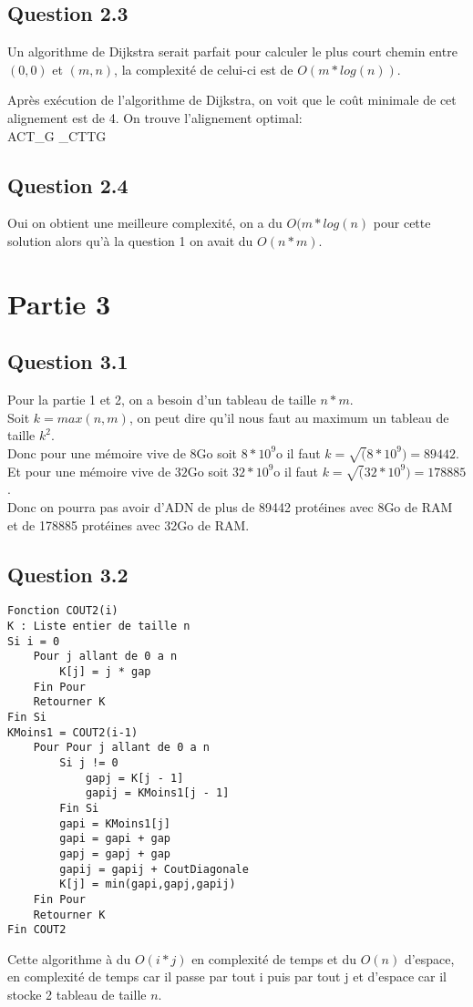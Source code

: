 \documentclass[5pt,a4paper]{report}
\begin{document}
	\subsection*{Question 2.3} 
	Un algorithme de Dijkstra serait parfait pour calculer le plus court chemin entre $(0,0)$ et $(m,n)$, la complexité de celui-ci est de $O(m*log(n))$.
	
	Après exécution de l'algorithme de Dijkstra, on voit que le coût minimale de cet alignement est de 4. On trouve l'alignement optimal:\\
	ACT\_G
	\_CTTG
	
	\subsection*{Question 2.4}
	Oui on obtient une meilleure complexité, on a du $O(m*log(n)$ pour cette solution alors qu'à la question 1 on avait du $O(n*m)$.
	
	\section*{Partie 3}
	\subsection*{Question 3.1}
	Pour la partie 1 et 2, on a besoin d'un tableau de taille $n*m$.\\
	Soit $k = max(n,m)$, on peut dire qu'il nous faut au maximum un tableau de taille $k^2$.\\
	Donc pour une mémoire vive de $8$Go soit $8*10^9$o il faut $k = \sqrt(8*10^9) = 89442$.\\
	Et pour une mémoire vive de $32$Go soit $32*10^9$o il faut $k = \sqrt(32*10^9) = 178885$.\\
	Donc on pourra pas avoir d'ADN de plus de 89442 protéines avec 8Go de RAM et de 178885 protéines avec 32Go de RAM.
	
	\subsection*{Question 3.2}
	\begin{lstlisting}
Fonction COUT2(i)
K : Liste entier de taille n
Si i = 0
	Pour j allant de 0 a n
		K[j] = j * gap
	Fin Pour
	Retourner K
Fin Si
KMoins1 = COUT2(i-1)
	Pour Pour j allant de 0 a n
		Si j != 0
			gapj = K[j - 1]
			gapij = KMoins1[j - 1]
		Fin Si
		gapi = KMoins1[j]
		gapi = gapi + gap
		gapj = gapj + gap
		gapij = gapij + CoutDiagonale
		K[j] = min(gapi,gapj,gapij)
	Fin Pour
	Retourner K
Fin COUT2
	\end{lstlisting}
	Cette algorithme à du $O(i * j)$ en complexité de temps et du $O(n)$ d'espace, en complexité de 
	temps car il passe par tout i puis par tout j et d'espace car il stocke 2 tableau de taille $n$.
	
\end{document}
